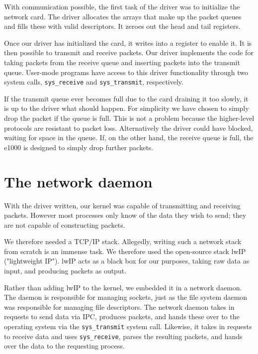 \documentclass{report}
\begin{document}
With communication possible, the first task of the driver was to initialize
the network card. The driver allocates the arrays that make up the packet
queues and fills these with valid descriptors. It zeroes out the head and tail
registers.

Once our driver has initialized the card, it writes into a register to enable
it. It is then possible to transmit and receive packets. Our driver implements
the code for taking packets from the receive queue and inserting packets into
the transmit queue. User-mode programs have access to this driver
functionality through two system calls, \texttt{sys\_receive} and
\texttt{sys\_transmit}, respectively.

If the transmit queue ever becomes full due to the card draining it too
slowly, it is up to the driver what should happen. For simplicity we have
chosen to simply drop the packet if the queue is full. This is not a problem
because the higher-level protocols are resistant to packet loss. Alternatively
the driver could have blocked, waiting for space in the queue. If, on the
other hand, the receive queue is full, the e1000 is designed to simply drop
further packets.




\section{The network daemon}
With the driver written, our kernel was capable of transmitting and receiving
packets. However most processes only know of the data they wish to send; they
are not capable of constructing packets.

We therefore needed a TCP/IP stack. Allegedly, writing such a network stack
from scratch is an immense task. We therefore used the open-source stack lwIP
("lightweight IP"). lwIP acts as a black box for our purposes, taking raw data
as input, and producing packets as output.

Rather than adding lwIP to the kernel, we embedded it in a network daemon. The
daemon is responsible for managing sockets, just as the file system daemon was
responsible for managing file descriptors. The network daemon takes in
requests to send data via IPC, produces packets, and hands these over to the
operating system via the \texttt{sys\_transmit} system call. Likewise, it
takes in requests to receive data and uses \texttt{sys\_receive}, parses the
resulting packets, and hands over the data to the requesting process.
\end{document}
